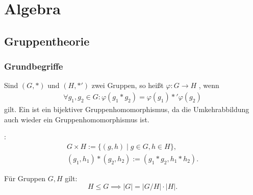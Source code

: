 
\chapter{Algebra}
\section{Gruppentheorie}
\subsection{Grundbegriffe}
\begin{definition}[Gruppenhomomorphismus]
Sind $(G,*)$ und $(H,*')$ zwei Gruppen, so
heißt $\varphi\colon G\to H$ %
, wenn
\begin{gather}
\forall g_1,g_2\in G\colon
  \varphi(g_1*g_2) = \varphi(g_1)*'\varphi(g_2)
\end{gather}
gilt. Ein 
ist ein bijektiver Gruppenhomomorphismus, da die Umkehrabbildung
auch wieder ein Gruppenhomomorphismus ist.
\end{definition}
\begin{definition}
:
\begin{gather}
G\times H := \{(g,h)\mid g\in G, h\in H\},\\
(g_1,h_1)*(g_2,h_2) := (g_1*g_2, h_1*h_2).
\end{gather}
\end{definition}
\noindent
{} Für Gruppen $G,H$ gilt:
\begin{equation}
H\le G\implies |G| = |G/H|\cdot |H|.
\end{equation}

